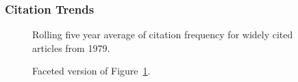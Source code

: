 \documentclass[
  10pt,
  letterpaper,
  DIV=11,
  numbers=noendperiod,
  twoside]{scrartcl}
\begin{document}
\subsubsection*{Citation Trends}\label{citation-trends-3}

\begin{figure}


\caption{\label{fig-citation-spaghetti-1979}Rolling five year average of
citation frequency for widely cited articles from 1979.}

\end{figure}%

\begin{figure}


\caption{\label{fig-citation-facet-1979}Faceted version of
Figure~\ref{fig-citation-spaghetti-1979}.}

\end{figure}%
\end{document}
